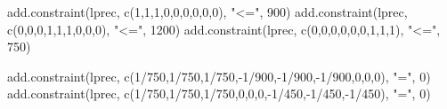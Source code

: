 \documentclass[
]{article}
\newenvironment{Shaded}{\begin{snugshade}}{\end{snugshade}}
\newcommand{\DecValTok}[1]{\textcolor[rgb]{0.00,0.00,0.81}{#1}}
\newcommand{\FunctionTok}[1]{\textcolor[rgb]{0.00,0.00,0.00}{#1}}
\newcommand{\NormalTok}[1]{#1}
\newcommand{\SpecialCharTok}[1]{\textcolor[rgb]{0.00,0.00,0.00}{#1}}
\newcommand{\StringTok}[1]{\textcolor[rgb]{0.31,0.60,0.02}{#1}}
\begin{document}
\begin{Shaded}
\begin{Highlighting}[]
\FunctionTok{add.constraint}\NormalTok{(lprec, }\FunctionTok{c}\NormalTok{(}\DecValTok{1}\NormalTok{,}\DecValTok{1}\NormalTok{,}\DecValTok{1}\NormalTok{,}\DecValTok{0}\NormalTok{,}\DecValTok{0}\NormalTok{,}\DecValTok{0}\NormalTok{,}\DecValTok{0}\NormalTok{,}\DecValTok{0}\NormalTok{,}\DecValTok{0}\NormalTok{), }\StringTok{"\textless{}="}\NormalTok{, }\DecValTok{900}\NormalTok{)}
\FunctionTok{add.constraint}\NormalTok{(lprec, }\FunctionTok{c}\NormalTok{(}\DecValTok{0}\NormalTok{,}\DecValTok{0}\NormalTok{,}\DecValTok{0}\NormalTok{,}\DecValTok{1}\NormalTok{,}\DecValTok{1}\NormalTok{,}\DecValTok{1}\NormalTok{,}\DecValTok{0}\NormalTok{,}\DecValTok{0}\NormalTok{,}\DecValTok{0}\NormalTok{), }\StringTok{"\textless{}="}\NormalTok{, }\DecValTok{1200}\NormalTok{)}
\FunctionTok{add.constraint}\NormalTok{(lprec, }\FunctionTok{c}\NormalTok{(}\DecValTok{0}\NormalTok{,}\DecValTok{0}\NormalTok{,}\DecValTok{0}\NormalTok{,}\DecValTok{0}\NormalTok{,}\DecValTok{0}\NormalTok{,}\DecValTok{0}\NormalTok{,}\DecValTok{1}\NormalTok{,}\DecValTok{1}\NormalTok{,}\DecValTok{1}\NormalTok{), }\StringTok{"\textless{}="}\NormalTok{, }\DecValTok{750}\NormalTok{)}
\end{Highlighting}
\end{Shaded}

\begin{Shaded}
\begin{Highlighting}[]
\FunctionTok{add.constraint}\NormalTok{(lprec, }\FunctionTok{c}\NormalTok{(}\DecValTok{1}\SpecialCharTok{/}\DecValTok{750}\NormalTok{,}\DecValTok{1}\SpecialCharTok{/}\DecValTok{750}\NormalTok{,}\DecValTok{1}\SpecialCharTok{/}\DecValTok{750}\NormalTok{,}\SpecialCharTok{{-}}\DecValTok{1}\SpecialCharTok{/}\DecValTok{900}\NormalTok{,}\SpecialCharTok{{-}}\DecValTok{1}\SpecialCharTok{/}\DecValTok{900}\NormalTok{,}\SpecialCharTok{{-}}\DecValTok{1}\SpecialCharTok{/}\DecValTok{900}\NormalTok{,}\DecValTok{0}\NormalTok{,}\DecValTok{0}\NormalTok{,}\DecValTok{0}\NormalTok{), }\StringTok{"="}\NormalTok{, }\DecValTok{0}\NormalTok{)}
\FunctionTok{add.constraint}\NormalTok{(lprec, }\FunctionTok{c}\NormalTok{(}\DecValTok{1}\SpecialCharTok{/}\DecValTok{750}\NormalTok{,}\DecValTok{1}\SpecialCharTok{/}\DecValTok{750}\NormalTok{,}\DecValTok{1}\SpecialCharTok{/}\DecValTok{750}\NormalTok{,}\DecValTok{0}\NormalTok{,}\DecValTok{0}\NormalTok{,}\DecValTok{0}\NormalTok{,}\SpecialCharTok{{-}}\DecValTok{1}\SpecialCharTok{/}\DecValTok{450}\NormalTok{,}\SpecialCharTok{{-}}\DecValTok{1}\SpecialCharTok{/}\DecValTok{450}\NormalTok{,}\SpecialCharTok{{-}}\DecValTok{1}\SpecialCharTok{/}\DecValTok{450}\NormalTok{), }\StringTok{"="}\NormalTok{, }\DecValTok{0}\NormalTok{)}
\end{Highlighting}
\end{Shaded}
\end{document}
